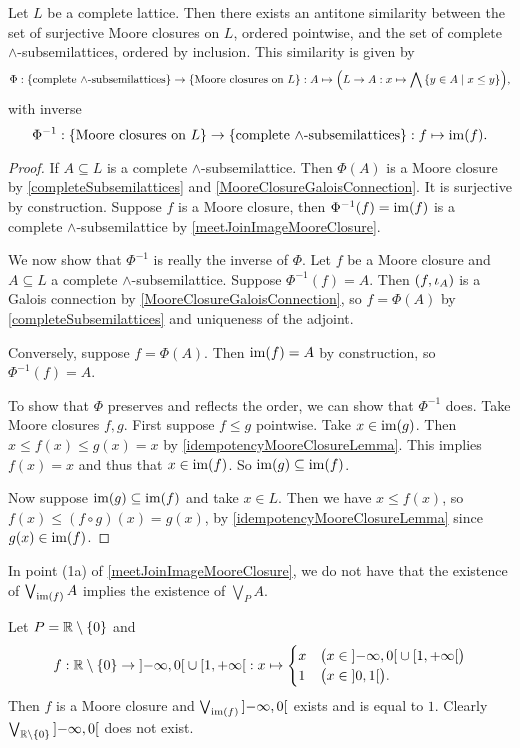 \begin{corollary} \label{antitoneCorrespondenceMooreClosuresCompleteSubsemilattices}
Let $L$ be a complete lattice. Then there exists an antitone similarity between the set of surjective Moore closures on $L$, ordered pointwise, and the set of complete $\wedge$-subsemilattices, ordered by inclusion. This similarity is given by
\[ \Phi: \{\text{complete $\wedge$-subsemilattices}\} \to \{\text{Moore closures on $L$}\}: A \mapsto \Big(L\to A: x\mapsto \bigwedge\setbuilder{y\in A}{x\leq y}\Big), \]
with inverse
\[ \Phi^{-1}: \{\text{Moore closures on $L$}\} \to \{\text{complete $\wedge$-subsemilattices}\}: f \mapsto \operatorname{im}(f). \]
\end{corollary}
\begin{proof}
If $A \subseteq L$ is a complete $\wedge$-subsemilattice. Then $\Phi(A)$ is a Moore closure by \ref{completeSubsemilattices} and \ref{MooreClosureGaloisConnection}. It is surjective by construction.
Suppose $f$ is a Moore closure, then $\Phi^{-1}(f) = \operatorname{im}(f)$ is a complete $\wedge$-subsemilattice by \ref{meetJoinImageMooreClosure}.

We now show that $\Phi^{-1}$ is really the inverse of $\Phi$. Let $f$ be a Moore closure and $A \subseteq L$ a complete $\wedge$-subsemilattice. 
Suppose $\Phi^{-1}(f) = A$. Then $(f, \operatorname{\iota}_{A})$ is a Galois connection by \ref{MooreClosureGaloisConnection}, so $f = \Phi(A)$ by \ref{completeSubsemilattices} and uniqueness of the adjoint. 

Conversely, suppose $f = \Phi(A)$. Then $\operatorname{im}(f) = A$ by construction, so $\Phi^{-1}(f) = A$.

To show that $\Phi$ preserves and reflects the order, we can show that $\Phi^{-1}$ does. Take Moore closures $f,g$. First suppose $f \leq g$ pointwise. Take $x\in \operatorname{im}(g)$. Then $x\leq f(x) \leq g(x) = x$ by \ref{idempotencyMooreClosureLemma}. This implies $f(x) = x$ and thus that $x\in \operatorname{im}(f)$. So $\operatorname{im}(g) \subseteq \operatorname{im}(f)$.

Now suppose $\operatorname{im}(g) \subseteq \operatorname{im}(f)$ and take $x\in L$. Then we have $x\leq f(x)$, so $f(x) \leq (f\circ g)(x) = g(x)$, by \ref{idempotencyMooreClosureLemma} since $g(x) \in \operatorname{im}(f)$.
\end{proof}

\begin{example}
In point (1a) of \ref{meetJoinImageMooreClosure}, we do not have that the existence of $\bigvee_{\operatorname{im}(f)}A$ implies the existence of $\bigvee_P A$.

Let $P = \mathbb{R}\setminus\{0\}$ and
\[ f: \R\setminus\{0\} \to \interval[o]{-\infty, 0}\cup \interval[co]{1,+\infty}: x\mapsto \begin{cases}
x & \big(x\in \interval[o]{-\infty, 0}\cup \interval[co]{1,+\infty}\big) \\
1 & \big(x\in \interval[o]{0,1}\big).
\end{cases} \]
Then $f$ is a Moore closure and $\bigvee_{\im(f)}\interval[o]{-\infty, 0}$ exists and is equal to $1$. Clearly $\bigvee_{\R\setminus\{0\}}\interval[o]{-\infty, 0}$ does not exist.
\end{example}

